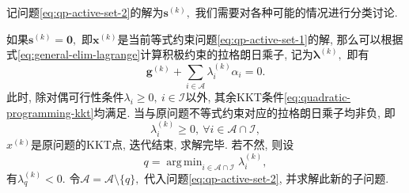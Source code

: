 \documentclass{SBCbookchapter}
\newcommand{\V}[1]{{\bm{#1}}}
\DeclareMathOperator*{\argmin}{arg\,min}
\numberwithin{equation}{section}
\begin{document}
记问题\eqref{eq:qp-active-set-2}的解为$\V{s}^{(k)},$ 我们需要对各种可能的情况进行分类讨论.

如果$\V{s}^{(k)} = \V{0},$ 即$\V{x}^{(k)}$是当前等式约束问题\eqref{eq:qp-active-set-1}的解, 那么可以根据式\eqref{eq:general-elim-lagrange}计算积极约束的拉格朗日乘子, 记为$\V{\lambda}^{(k)},$ 即有
\begin{equation}
\label{eq:qp-active-set-lambda}
\V{g}^{(k)} + \sum\limits_{i \in \mathcal{A}} \lambda_i^{(k)} \alpha_i = 0.
\end{equation}
此时, 除对偶可行性条件$\lambda_i \geqslant 0, ~ i \in \mathcal{I}$以外, 其余KKT条件\eqref{eq:quadratic-programming-kkt}均满足. 当与原问题不等式约束对应的拉格朗日乘子均非负, 即
\begin{equation*}
\lambda_i^{(k)} \geqslant 0, ~ \forall i \in \mathcal{A} \cap \mathcal{I},
\end{equation*}
$x^{(k)}$是原问题的KKT点, 迭代结束, 求解完毕. 若不然, 则设
\begin{equation*}
q = \argmin_{i \in \mathcal{A} \cap \mathcal{I}} \lambda_i^{(k)},
\end{equation*}
有$\lambda_q^{(k)} < 0.$ 令$\mathcal{A} = \mathcal{A} \setminus \{ q \},$ 代入问题\eqref{eq:qp-active-set-2}, 并求解此新的子问题.
\end{document}
